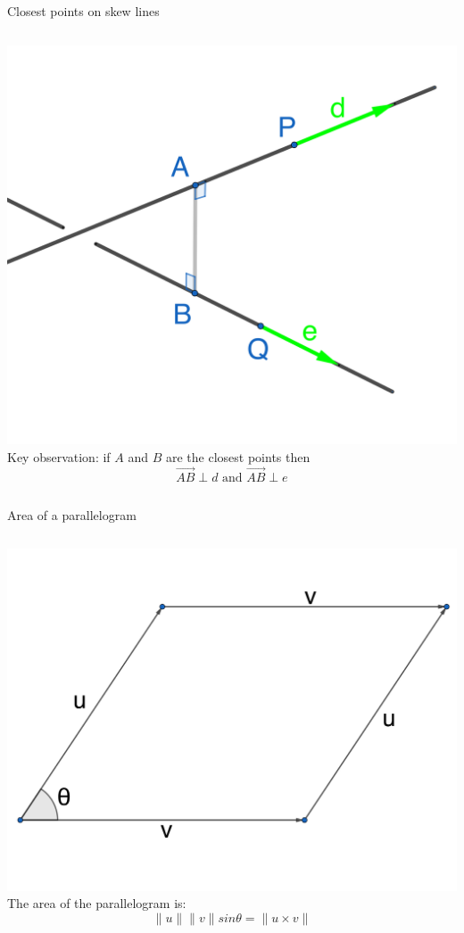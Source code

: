 \documentclass{beamer}
\begin{document}
\begin{frame}{Closest points on skew lines}
\begin{columns}
    \hspace{-1cm}
    \includegraphics[scale=0.3]{skwe-lines.png}
    Key observation: if $A$ and $B$ are the closest points then
    \begin{equation*}
    \overrightarrow {AB} \perp d\text{ and } \overrightarrow {AB} \perp e
    \end{equation*}
\end{columns}
\end{frame}

\begin{frame}{Area of a parallelogram}
\begin{columns}
  \includegraphics{parallelogram.png}
  The area of the parallelogram is:
  \begin{equation*}
  \|u\|\|v\|sin\theta = \|u\times v\|
  \end{equation*}
\end{columns}
\end{frame}
\end{document}
